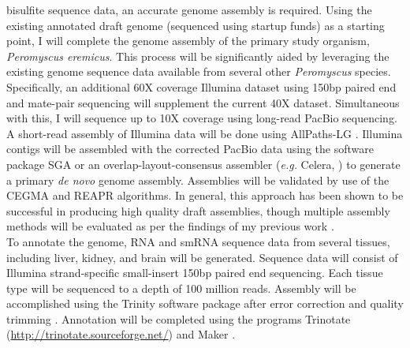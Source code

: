 \documentclass[11pt]{article}
\begin{document}
bisulfite sequence data, an accurate genome assembly is required. Using the existing annotated draft genome (sequenced using startup funds) as a starting point, I will complete the genome assembly of the primary study organism, \textit{Peromyscus eremicus}. This process will be significantly aided by leveraging the existing genome sequence data available from several other \textit{Peromyscus} species. Specifically, an additional 60X coverage Illumina dataset using 150bp paired end and mate-pair sequencing will supplement the current 40X dataset. Simultaneous with this, I will sequence up to 10X coverage using long-read PacBio sequencing. A short-read assembly of Illumina data will be done using AllPaths-LG \citep{Maccallum:2009du}. Illumina contigs will be assembled with the corrected PacBio data using the software package SGA \citep{Simpson:2012ef} or an overlap-layout-consensus assembler (\textit{e.g.} Celera, \cite{Miller:2008jx}) to generate a primary \textit{de novo} genome assembly. Assemblies will be validated by use of the CEGMA \citep{Parra:2007df} and REAPR \citep{Hunt:2013hj} algorithms. In general, this approach has been shown to be successful in producing high quality draft assemblies, though multiple assembly methods will be evaluated as per the findings of my previous work \citep{Bradnam:2013gx}.\\




To annotate the genome, RNA and smRNA sequence data from several tissues, including liver, kidney, and brain will be generated. Sequence data will consist of Illumina strand-specific small-insert 150bp paired end sequencing. Each tissue type will be sequenced to a depth of 100 million reads. Assembly will be accomplished using the Trinity software package \citep{Haas:2013jq,Grabherr:2011jb} after error correction \citep{MacManes:2013ec} and quality trimming \citep{MacManes:2013ex}. Annotation will be completed using the programs Trinotate (\url{http://trinotate.sourceforge.net/}) and Maker \citep{Cantarel:2008jo}. \\
\end{document}
